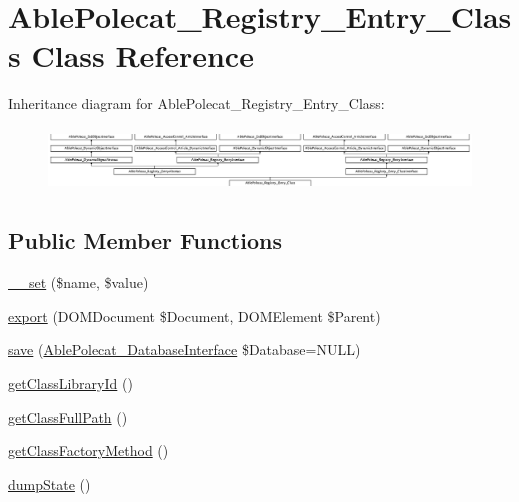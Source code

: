 \hypertarget{class_able_polecat___registry___entry___class}{}\section{Able\+Polecat\+\_\+\+Registry\+\_\+\+Entry\+\_\+\+Class Class Reference}
\label{class_able_polecat___registry___entry___class}
Inheritance diagram for Able\+Polecat\+\_\+\+Registry\+\_\+\+Entry\+\_\+\+Class\+:\begin{figure}[H]
\begin{center}
\leavevmode
\includegraphics[height=1.707317cm]{class_able_polecat___registry___entry___class}
\end{center}
\end{figure}
\subsection*{Public Member Functions}
\begin{DoxyCompactItemize}
\item 
\hyperlink{class_able_polecat___registry___entry___class_a83c2703c91959192f759992ad5640b67}{\+\_\+\+\_\+set} (\$name, \$value)
\item 
\hyperlink{class_able_polecat___registry___entry___class_a0a05b2e4b3a44390eeb042064e427b1a}{export} (D\+O\+M\+Document \$Document, D\+O\+M\+Element \$Parent)
\item 
\hyperlink{class_able_polecat___registry___entry___class_a999eef977eb899167ae02f83dd26a4ae}{save} (\hyperlink{interface_able_polecat___database_interface}{Able\+Polecat\+\_\+\+Database\+Interface} \$Database=N\+U\+L\+L)
\item 
\hyperlink{class_able_polecat___registry___entry___class_a51ab292213d530e6ec65ef6c1a59b244}{get\+Class\+Library\+Id} ()
\item 
\hyperlink{class_able_polecat___registry___entry___class_a007ade3aa1414f464fe5670e2ee3b3e5}{get\+Class\+Full\+Path} ()
\item 
\hyperlink{class_able_polecat___registry___entry___class_a1234be8925a14bd9f504ebd18a16b4ed}{get\+Class\+Factory\+Method} ()
\item 
\hyperlink{class_able_polecat___registry___entry___class_a360f67f13d61bf6813ff78d869d9fca6}{dump\+State} ()
\end{DoxyCompactItemize}
